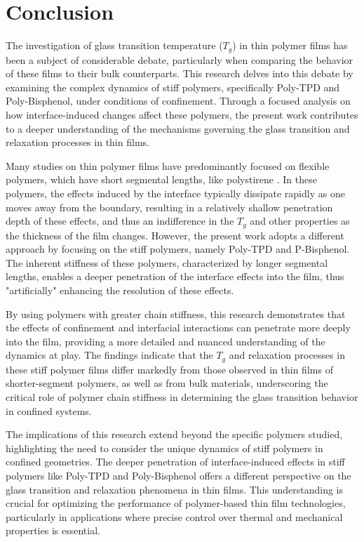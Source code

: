 \clearpage


\chapter{Conclusion}

The investigation of glass transition temperature (\(T_g\)) in thin polymer films has been a subject of considerable debate, particularly when comparing the behavior of these films to their bulk counterparts. This research delves into this debate by examining the complex dynamics of stiff polymers, specifically Poly-TPD and Poly-Bisphenol, under conditions of confinement. Through a focused analysis on how interface-induced changes affect these polymers, the present work contributes to a deeper understanding of the mechanisms governing the glass transition and relaxation processes in thin films.

Many studies on thin polymer films have predominantly focused on flexible polymers, which have short segmental lengths, like polystirene \cite{winkler2021}. In these polymers, the effects induced by the interface typically dissipate rapidly as one moves away from the boundary, resulting in a relatively shallow penetration depth of these effects, and thus an indifference in the $T_g$ and other properties as the thickness of the film changes. However, the present work adopts a different approach by focusing on the stiff polymers, namely Poly-TPD and P-Bisphenol. The inherent stiffness of these polymers, characterized by longer segmental lengths, enables a deeper penetration of the interface effects into the film, thus "artificially" enhancing the resolution of these effects.

By using polymers with greater chain stiffness, this research demonstrates that the effects of confinement and interfacial interactions can penetrate more deeply into the film, providing a more detailed and nuanced understanding of the dynamics at play. The findings indicate that the \(T_g\) and relaxation processes in these stiff polymer films differ markedly from those observed in thin films of shorter-segment polymers, as well as from bulk materials, underscoring the critical role of polymer chain stiffness in determining the glass transition behavior in confined systems.

The implications of this research extend beyond the specific polymers studied, highlighting the need to consider the unique dynamics of stiff polymers in confined geometries. The deeper penetration of interface-induced effects in stiff polymers like Poly-TPD and Poly-Bisphenol offers a different perspective on the glass transition and relaxation phenomena in thin films. This understanding is crucial for optimizing the performance of polymer-based thin film technologies, particularly in applications where precise control over thermal and mechanical properties is essential.




\noindent
